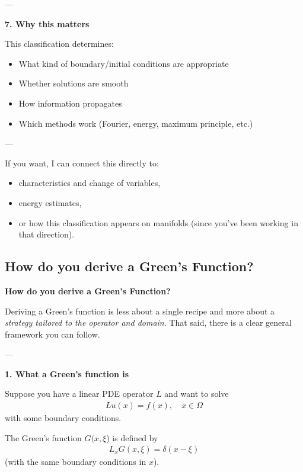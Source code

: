 \documentclass[12pt,a4paper]{report}
\begin{document}
\begin{description}
\begin{description}
---

\item \textbf{7. Why this matters}

This classification determines:

\begin{itemize}
\item What kind of boundary/initial conditions are appropriate
\item Whether solutions are smooth
\item How information propagates
\item Which methods work (Fourier, energy, maximum principle, etc.)
\end{itemize}

---
\end{description}

If you want, I can connect this directly to:

\begin{itemize}
\item characteristics and change of variables,
\item energy estimates,
\item or how this classification appears on manifolds (since you’ve been working in that direction).
\end{itemize}

\HLINE
\newpage
\subsection*{How do you derive a Green's Function?}

\item \textbf{How do you derive a Green's Function?}

Deriving a Green’s function is less about a single recipe and more about a \textit{strategy tailored to the operator and domain}. That said, there is a clear general framework you can follow.

---

\begin{description}
\item \textbf{1. What a Green’s function is}

Suppose you have a linear PDE operator $L$ and want to solve
\begin{align*}
L u(x) = f(x), \quad x \in \Omega
\end{align*}
with some boundary conditions.

The Green’s function $G(x,\xi$) is defined by
\begin{align*}
L_x G(x,\xi) = \delta(x-\xi)
\end{align*}
(with the same boundary conditions in $x$).


\end{description}
\end{description}
\end{document}
